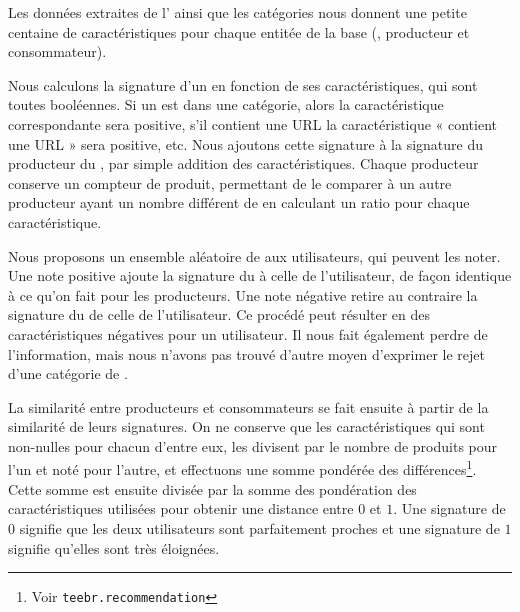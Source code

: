 Les données extraites de l’\api{} ainsi que les catégories nous donnent une
petite centaine de caractéristiques pour chaque entitée de la base (\tweet{},
producteur et consommateur).

Nous calculons la signature d’un \tweet{} en fonction de ses caractéristiques,
qui sont toutes booléennes. Si un \tweet{} est dans une catégorie, alors la
caractéristique correspondante sera positive, s’il contient une URL la
caractéristique « contient une URL » sera positive, etc. Nous ajoutons cette
signature à la signature du producteur du \tweet{}, par simple addition des
caractéristiques. Chaque producteur conserve un compteur de \tweets{} produit,
permettant de le comparer à un autre producteur ayant un nombre différent de
\tweets{} en calculant un ratio pour chaque caractéristique.

Nous proposons un ensemble aléatoire de \tweets{} aux utilisateurs, qui peuvent
les noter. Une note positive ajoute la signature du \tweet{} à celle de
l’utilisateur, de façon identique à ce qu’on fait pour les producteurs. Une
note négative retire au contraire la signature du \tweet{} de celle de
l’utilisateur. Ce procédé peut résulter en des caractéristiques négatives pour
un utilisateur. Il nous fait également perdre de l’information, mais nous
n’avons pas trouvé d’autre moyen d’exprimer le rejet d’une catégorie de
\tweets{}.

La similarité entre producteurs et consommateurs se fait ensuite à partir de la
similarité de leurs signatures. On ne conserve que les caractéristiques qui
sont non-nulles pour chacun d’entre eux, les divisent par le nombre de
\tweets{} produits pour l’un et noté pour l’autre, et effectuons une somme
pondérée des différences\footnote{Voir \verb|teebr.recommendation|}. Cette
somme est ensuite divisée par la somme des pondération des caractéristiques
utilisées pour obtenir une distance entre $0$ et $1$. Une signature de $0$
signifie que les deux utilisateurs sont parfaitement proches et une signature
de $1$ signifie qu’elles sont très éloignées.
